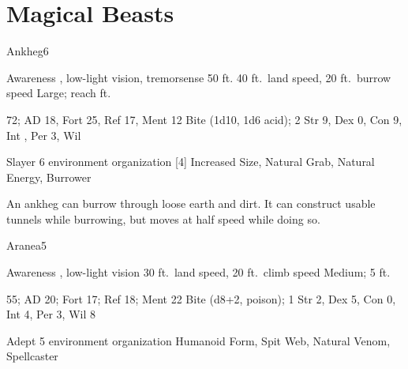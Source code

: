 \section{Magical Beasts}\label{Magical Beasts}

    \begin{monsection}{Ankheg}{6}
        \begin{spellcontent}
            \begin{spelltargetinginfo}
                \pari {} Awareness , low-light vision, tremorsense 50 ft.
                \pari {} 40 ft.\ land speed, 20 ft.\ burrow speed
                \pari {} Large;  reach ft.
            \end{spelltargetinginfo}
            \begin{spelleffects}
                \pari {} 72;  AD 18, Fort 25, Ref 17, Ment 12
                \pari {} Bite  (1d10, 1d6 acid);  2
                \pari {} Str 9, Dex 0, Con 9, Int , Per 3, Wil 
            \end{spelleffects}
        \end{spellcontent}
        \begin{spellfooter}
            \pari {} Slayer 6
            \pari {} environment
            \pari {} organization
            \pari {} [4] Increased Size, Natural Grab, Natural Energy, Burrower
        \end{spellfooter}
    \end{monsection}

     An ankheg can burrow through loose earth and dirt.
    It can construct usable tunnels while burrowing, but moves at half speed while doing so.

    \begin{monsection}{Aranea}{5}
        \begin{spellcontent}
            \begin{spelltargetinginfo}
                \pari {} Awareness , low-light vision
                \pari {} 30 ft.\ land speed, 20 ft.\ climb speed
                \pari {} Medium;  5 ft.
            \end{spelltargetinginfo}
            \begin{spelleffects}
                \pari {} 55;  AD 20; Fort 17; Ref 18; Ment 22
                \pari {} Bite  (d8+2, poison);  1
                \pari {} Str 2, Dex 5, Con 0, Int 4, Per 3, Wil 8
            \end{spelleffects}
        \end{spellcontent}
        \begin{spellfooter}
            \pari {} Adept 5
            \pari {} environment
            \pari {} organization
            \pari {} Humanoid Form, Spit Web, Natural Venom, Spellcaster
        \end{spellfooter}
    \end{monsection}

